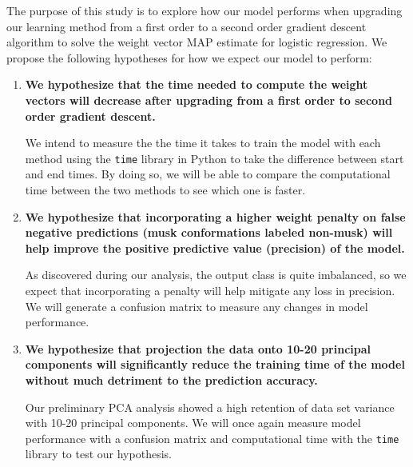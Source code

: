 \documentclass[12pt]{article}
\begin{document}
The purpose of this study is to explore how our model performs when upgrading our learning method from a first order to a second order gradient descent algorithm to solve the weight vector MAP estimate for logistic regression. We propose the following hypotheses for how we expect our model to perform:

\begin{enumerate}
\item \textbf{We hypothesize that the time needed to compute the weight vectors will decrease after upgrading from a first order to second order gradient descent.}

We intend to measure the the time it takes to train the model with each method using the \texttt{time} library in Python to take the difference between start and end times. By doing so, we will be able to compare the computational time between the two methods to see which one is faster.

\item \textbf{We hypothesize that incorporating a higher weight penalty on false negative predictions (musk conformations labeled non-musk) will help improve the positive predictive value (precision) of the model.}

As discovered during our analysis, the output class is quite imbalanced, so we expect that incorporating a penalty will help mitigate any loss in precision. We will generate a confusion matrix to measure any changes in model performance.

\item \textbf{We hypothesize that projection the data onto 10-20 principal components will significantly reduce the training time of the model without much detriment to the prediction accuracy.}

Our preliminary PCA analysis showed a high retention of data set variance with 10-20 principal components. We will once again measure model performance with a confusion matrix and computational time with the \texttt{time} library to test our hypothesis.

\end{enumerate}
\end{document}
